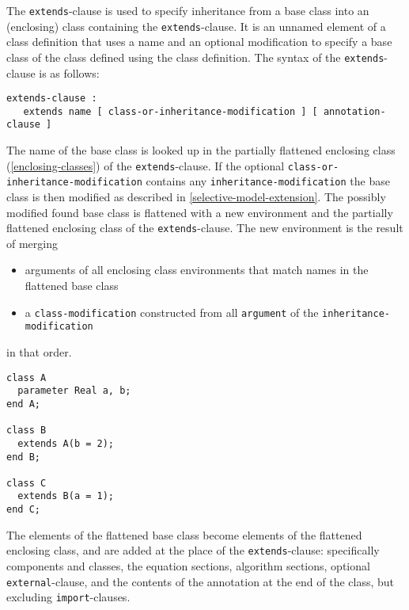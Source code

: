 The \lstinline!extends!-clause is used to specify inheritance from a base class into an (enclosing) class containing the \lstinline!extends!-clause.
It is an unnamed element of a class definition that uses a name and an optional modification to specify a base class of the class defined using the class definition.
The syntax of the \lstinline!extends!-clause is as follows:
\begin{lstlisting}[language=grammar]
extends-clause :
   extends name [ class-or-inheritance-modification ] [ annotation-clause ]
\end{lstlisting}%
The name of the base class is looked up in the partially flattened enclosing class (\cref{enclosing-classes}) of the \lstinline!extends!-clause.
If the optional \lstinline[language=grammar]!class-or-inheritance-modification! contains any \lstinline[language=grammar]!inheritance-modification! the base class is then modified as described in \cref{selective-model-extension}.
The possibly modified found base class is flattened with a new environment and the partially flattened enclosing class of the \lstinline!extends!-clause.
The new environment is the result of merging
\begin{itemize}
\item
  arguments of all enclosing class environments that match names in the flattened base class
\item
  a \lstinline[language=grammar]!class-modification! constructed from all \lstinline!argument! of the \lstinline[language=grammar]!inheritance-modification!
\end{itemize}
in that order.


\begin{example}
\begin{lstlisting}[language=modelica]
class A
  parameter Real a, b;
end A;

class B
  extends A(b = 2);
end B;

class C
  extends B(a = 1);
end C;
\end{lstlisting}
\end{example}

The elements of the flattened base class become elements of the flattened enclosing class, and are added at the place of the \lstinline!extends!-clause: specifically components and classes, the equation sections, algorithm sections, optional \lstinline!external!-clause, and the contents of the annotation at the end of the class, but excluding \lstinline!import!-clauses.


